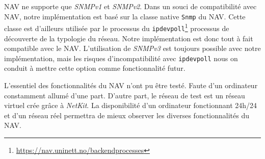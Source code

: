 NAV ne supporte que \emph{SNMPv1} et \emph{SNMPv2}. Dans un souci de compatibilité avec NAV, notre implémentation est basé sur la classe native \texttt{Snmp} du NAV. Cette classe est d'ailleurs utilisée par le processus du \texttt{ipdevpoll}\footnote{\url{https://nav.uninett.no/backendprocesses}} processus  de découverte de la typologie du réseau. Notre implémentation est donc tout à fait compatible avec le NAV. L'utilisation de \emph{SNMPv3} est toujours possible avec notre implémentation, mais les risques d'incompatibilité avec \texttt{ipdevpoll} nous on conduit à mettre cette option comme fonctionnalité futur.

L'essentiel des fonctionnalités du NAV n'ont pu être testé. Faute d'un ordinateur constamment allumé d'une part. D'autre part, le réseau de test est un réseau virtuel crée grâce à \emph{NetKit}. La disponibilité d'un ordinateur fonctionnant 24h/24 et d'un réseau réel  permettra de mieux observer les diverses fonctionnalités du NAV.